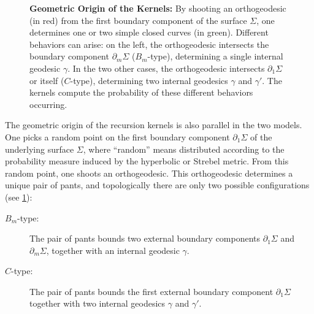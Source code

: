 \documentclass[a4paper,11pt,english]{article}
\theoremstyle{plain}
\theoremstyle{definition}
\theoremstyle{plain}
\newcommand{\de}{\partial}
\begin{document}
\begin{figure}[b]
{
  }
  \caption{
    \textbf{Geometric Origin of the Kernels:} By shooting an orthogeodesic (in red) from the first boundary component of the surface $\Sigma$, one determines one or two simple closed curves (in green). Different behaviors can arise: on the left, the orthogeodesic intersects the boundary component $\partial_m \Sigma$ ($B_m$-type), determining a single internal geodesic $\gamma$. In the two other cases, the orthogeodesic intersects $\partial_1 \Sigma$ or itself ($C$-type), determining two internal geodesics $\gamma$ and $\gamma'$. The kernels compute the probability of these different behaviors occurring.
    }
  \label{fig:orthogeodesic:behaviour}
\end{figure}

The geometric origin of the recursion kernels is also parallel in the two models. One picks a random point on the first boundary component $\partial_1 \Sigma$ of the underlying surface $\Sigma$, where “random” means distributed according to the probability measure induced by the hyperbolic or Strebel metric. From this random point, one shoots an orthogeodesic. This orthogeodesic determines a unique pair of pants, and topologically there are only two possible configurations (see \cref{fig:orthogeodesic:behaviour}):
\begin{description}
    \item[\boldmath$B_m$-type:] The pair of pants bounds two external boundary components $\partial_1 \Sigma$ and $\partial_m \Sigma$, together with an internal geodesic $\gamma$.
    \item[\boldmath$C$-type:] The pair of pants bounds the first external boundary component $\partial_1 \Sigma$ together with two internal geodesics $\gamma$ and $\gamma'$.
\end{description}
\end{document}
